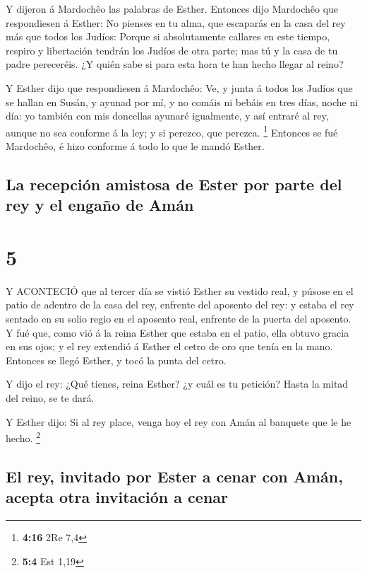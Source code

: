  Y dijeron á Mardochêo las palabras de Esther.
 Entonces dijo Mardochêo que respondiesen á Esther: No
pienses en tu alma, que escaparás en la casa del rey más que todos los
Judíos:  Porque si absolutamente callares en este tiempo,
respiro y libertación tendrán los Judíos de otra parte; mas tú y la casa
de tu padre pereceréis. ¿Y quién sabe si para esta hora te han hecho
llegar al reino?

 Y Esther dijo que respondiesen á Mardochêo: 
Ve, y junta á todos los Judíos que se hallan en Susán, y ayunad por mí,
y no comáis ni bebáis en tres días, noche ni día: yo también con mis
doncellas ayunaré igualmente, y así entraré al rey, aunque no sea
conforme á la ley; y si perezco, que perezca. \footnote{\textbf{4:16}
  2Re 7,4}  Entonces se fué Mardochêo, é hizo conforme á
todo lo que le mandó Esther.

\hypertarget{la-recepciuxf3n-amistosa-de-ester-por-parte-del-rey-y-el-engauxf1o-de-amuxe1n}{%
\subsection{La recepción amistosa de Ester por parte del rey y el engaño
de
Amán}\label{la-recepciuxf3n-amistosa-de-ester-por-parte-del-rey-y-el-engauxf1o-de-amuxe1n}}

\hypertarget{section-4}{%
\section{5}\label{section-4}}

 Y ACONTECIÓ que al tercer día se vistió Esther su vestido
real, y púsose en el patio de adentro de la casa del rey, enfrente del
aposento del rey: y estaba el rey sentado en su solio regio en el
aposento real, enfrente de la puerta del aposento.  Y fué
que, como vió á la reina Esther que estaba en el patio, ella obtuvo
gracia en sus ojos; y el rey extendió á Esther el cetro de oro que tenía
en la mano. Entonces se llegó Esther, y tocó la punta del cetro.

 Y dijo el rey: ¿Qué tienes, reina Esther? ¿y cuál es tu
petición? Hasta la mitad del reino, se te dará.

 Y Esther dijo: Si al rey place, venga hoy el rey con Amán
al banquete que le he hecho. \footnote{\textbf{5:4} Est 1,19}

\hypertarget{el-rey-invitado-por-ester-a-cenar-con-amuxe1n-acepta-otra-invitaciuxf3n-a-cenar}{%
\subsection{El rey, invitado por Ester a cenar con Amán, acepta otra
invitación a
cenar}\label{el-rey-invitado-por-ester-a-cenar-con-amuxe1n-acepta-otra-invitaciuxf3n-a-cenar}}


